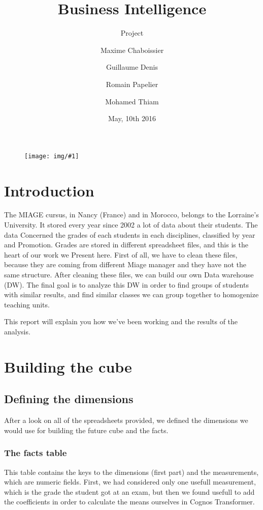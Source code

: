 \documentclass[11pt, a4paper]{article}
\title{Business Intelligence}
\subtitle{Project}
\date{May, 10th 2016}
\author{%
    Maxime Chaboissier
	\and
    Guillaume Denis 
    \and
    Romain Papelier
    \and
    Mohamed Thiam
}
\newcommand\image[2]{
	\begin{figure}[H]
	\centering
	\texttt{[image: img/\#1]}
	\end{figure}
}
\begin{document}
    \clearpage
	\maketitle
    \thispagestyle{empty}
    \vspace*{5cm}
    \image{loupe.png}{100px}
   \newpage

   \tableofcontents

   \newpage
  
    
    \section{Introduction}
    The MIAGE cursus, in Nancy (France) and in Morocco, belongs to the Lorraine’s
    University. It stored every year since 2002 a lot of data about their students. The data
    Concerned the grades of each students in each disciplines, classified by year and
    Promotion.
    Grades are stored in different spreadsheet files, and this is the heart of our work we
    Present here.
    First of all, we have to clean these files, because they are coming from different
    Miage manager and they have not the same structure. After cleaning these files, we can
    build our own Data warehouse (DW).
    The final goal is to analyze this DW in order to find groups of students with similar
    results, and find similar classes we can group together to homogenize teaching units.

    This report will explain you how we’ve been working and the results of the analysis.
    \newpage

    \section{Building the cube}
    \subsection{Defining the dimensions}

    After a look on all of the spreadsheets provided, we defined the dimensions we would use for building the future cube and the facts.

     \subsubsection{The facts table}
     This table contains the keys to the dimensions (first part) and the measurements, which are
     numeric fields. First, we had considered only one usefull measurement, which is the grade the student got at an exam, but then we found usefull to add the coefficients in order to calculate the means ourselves in Cognos Transformer.
\end{document}

